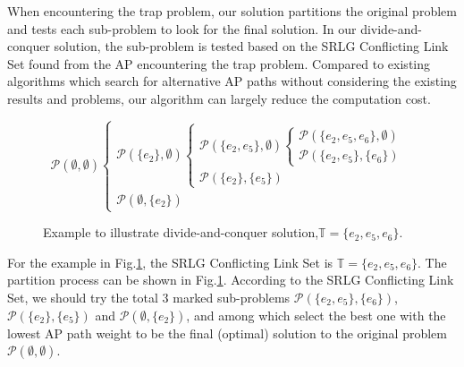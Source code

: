 When encountering the trap problem, our solution partitions the original problem and tests each sub-problem to look for the final solution. In our divide-and-conquer solution, the sub-problem is tested based on the SRLG Conflicting Link Set found from the AP encountering the trap problem. Compared to existing algorithms which search for alternative AP paths without considering the existing results and problems, our algorithm can largely reduce the computation cost.
\begin{figure}[tp]
\small{
\begin{equation*}
{\mathcal P}(\emptyset ,\emptyset )\left\{ {\begin{array}{*{20}{l}}
{{\mathcal P}(\{ e_2\} ,\emptyset )\left\{ {\begin{array}{*{20}{l}}
{{\mathcal P}(\{ e_2,e_5\} ,\emptyset )\left\{ {\begin{array}{*{20}{l}}
{{\mathcal P}(\{ e_2,e_5,e_6\} ,\emptyset )}\\
{\boxed{{\mathcal P}(\{ e_2,e_5\} ,\{ e_6\} )}}
\end{array}} \right.}\\
{\boxed{{\mathcal P}(\{ e_2\} ,\{ e_5\} )}}
\end{array}} \right.}\\
{\boxed{{\mathcal P}(\emptyset ,\{ e_2\} )}}
\end{array}} \right.
\end{equation*}
}
\caption{Example to illustrate divide-and-conquer solution,$\mathbb{T}=\{e_2,e_5,e_6\}$.}
\label{fig:DividedConquer}
\end{figure}
For the example in Fig.\ref{fig:DividedConquer}, the SRLG Conflicting Link Set is $\mathbb{T}=\{e_2,e_5,e_6\}$.  The partition process can be shown in Fig.\ref{fig:DividedConquer}.  According to the SRLG Conflicting Link Set, we should try the total $3$ marked sub-problems ${{\mathcal{P}}(\{ e_2,e_5\} ,\{ e_6\} )}$, ${{\mathcal{P}}(\{ e_2\} ,\{ e_5\} )}$ and ${{\mathcal{P}}(\emptyset ,\{ e_2\} )}$,  and among which select the best one with the lowest AP path weight to be the final (optimal) solution to the original problem  $\mathcal{P}(\emptyset,\emptyset)$.


